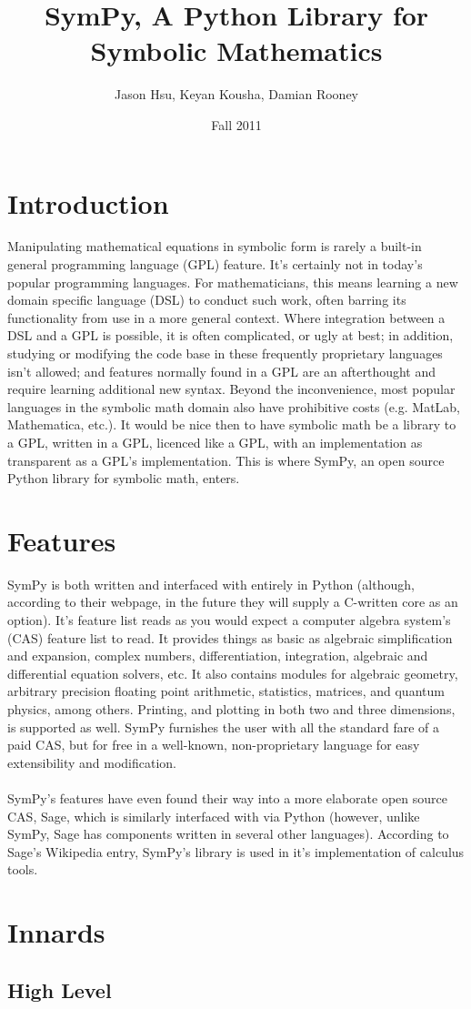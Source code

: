 \documentclass[11pt,a4paper,oneside]{report}
\begin{document}
\title{SymPy, A Python Library for Symbolic Mathematics}
\author{Jason Hsu, Keyan Kousha, Damian Rooney}
\date{Fall 2011}
\maketitle
\section*{Introduction}
Manipulating mathematical equations in symbolic form is rarely a built-in general programming language (GPL) feature. It's certainly not in today's popular programming languages. For mathematicians, this means learning a new domain specific language (DSL) to conduct such work, often barring its functionality from use in a more general context. Where integration between a DSL and a GPL is possible, it is often complicated, or ugly at best; in addition, studying or modifying the code base in these frequently proprietary languages isn't allowed; and features normally found in a GPL are an afterthought and require learning additional new syntax. Beyond the inconvenience, most popular languages in the symbolic math domain also have prohibitive costs (e.g. MatLab, Mathematica, etc.). It would be nice then to have symbolic math be a library to a GPL, written in a GPL, licenced like a GPL, with an implementation as transparent as a GPL's implementation. This is where SymPy, an open source Python library for symbolic math, enters.
\section*{Features}
SymPy is both written and interfaced with entirely in Python (although, according to their webpage, in the future they will supply a C-written core as an option). It's feature list reads as you would expect a computer algebra system's (CAS) feature list to read. It provides things as basic as algebraic simplification and expansion, complex numbers, differentiation, integration, algebraic and differential equation solvers, etc. It also contains modules for algebraic geometry, arbitrary precision floating point arithmetic, statistics, matrices, and quantum physics, among others. Printing, and plotting in both two and three dimensions, is supported as well. SymPy furnishes the user with all the standard fare of a paid CAS, but for free in a well-known, non-proprietary language for easy extensibility and modification.\\\\
 SymPy's features have even found their way into a more elaborate open source CAS, Sage, which is similarly interfaced with via Python (however, unlike SymPy, Sage has components written in several other languages). According to Sage's Wikipedia entry, SymPy's library is used in it's implementation of calculus tools.
 \section*{Innards}
 \subsection*{\small High Level}
\end{document}
